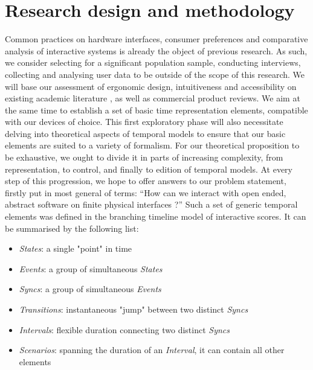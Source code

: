 \documentclass[journal,onecolumn]{IEEEtran}
\begin{document}
\section{Research design and methodology} %
Common practices on hardware interfaces, consumer preferences and comparative analysis of interactive systems is already the object of previous research. As such, we consider selecting for a significant population sample, conducting interviews, collecting and analysing user data to be outside of the scope of this research. We will base our assessment of ergonomic design, intuitiveness and accessibility on existing academic literature \cite{rossmy:grid}\cite{pust:taxonomy}, as well as commercial product reviews. We aim at the same time to establish a set of basic time representation elements, compatible with our devices of choice. This first exploratory phase will also necessitate delving into theoretical aspects of temporal models \cite{toro:condition}\cite{milliere:topologie} to ensure that our basic elements are suited to a variety of formalism. For our theoretical proposition to be exhaustive, we ought to divide it in parts of increasing complexity, from representation, to control, and finally to edition of temporal models. At every step of this progression, we hope to offer answers to our problem statement, firstly put in most general of terms: ``How can we interact with open ended, abstract software on finite physical interfaces ?'' 
Such a set of generic temporal elements was defined in the branching timeline model of interactive scores\cite{jcelerier:thesis}. It can be summarised by the following list:
\begin{itemize}
    \item \textit{States}: a single "point" in time
    \item \textit{Events}: a group of simultaneous \textit{States}
    \item \textit{Syncs}: a group of simultaneous \textit{Events}
    \item \textit{Transitions}: instantaneous "jump" between two distinct \textit{Syncs}
    \item \textit{Intervals}: flexible duration connecting two distinct \textit{Syncs}
    \item \textit{Scenarios}: spanning the duration of an \textit{Interval}, it can contain all other elements
\end{itemize}
\end{document}
